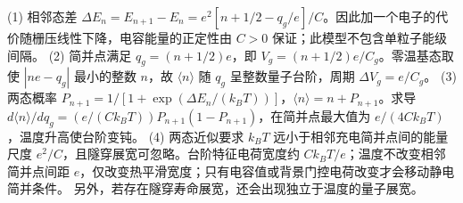 (1) 相邻态差 \(\Delta E_n=E_{n+1}-E_n=e^2[n+1/2-q_g/e]/C\)。因此加一个电子的代价随栅压线性下降，电容能量的正定性由 \(C>0\) 保证；此模型不包含单粒子能级间隔。
(2) 简并点满足 \(q_g=(n+1/2)e\)，即 \(V_g=(n+1/2)e/C_g\)。零温基态取使 \(|ne-q_g|\) 最小的整数 \(n\)，故 \(\langle n\rangle\) 随 \(q_g\) 呈整数量子台阶，周期 \(\Delta V_g=e/C_g\)。
(3) 两态概率 \(P_{n+1}=1/[1+\exp(\Delta E_n/(k_BT))]\)，\(\langle n\rangle=n+P_{n+1}\)。求导 \(d\langle n\rangle/dq_g=(e/(Ck_BT))P_{n+1}(1-P_{n+1})\)，在简并点最大值为 \(e/(4Ck_BT)\)，温度升高使台阶变钝。
(4) 两态近似要求 \(k_BT\) 远小于相邻充电简并点间的能量尺度 \(e^2/C\)，且隧穿展宽可忽略。台阶特征电荷宽度约 \(Ck_BT/e\)；温度不改变相邻简并点间距 \(e\)，仅改变热平滑宽度；只有电容值或背景门控电荷改变才会移动静电简并条件。 另外，若存在隧穿寿命展宽，还会出现独立于温度的量子展宽。
